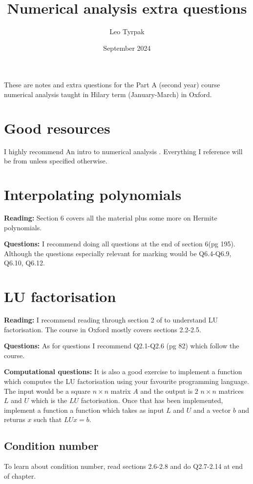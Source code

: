\documentclass{article}
\title{Numerical analysis extra questions}
\author{Leo Tyrpak}
\date{September 2024}
\begin{document}
\maketitle
These are notes and extra questions for the Part A (second year) course numerical analysis taught in Hilary term (January-March) in Oxford.
\section{Good resources}
I highly recommend An intro to numerical analysis \cite{NAbook}.
Everything I reference will be from \cite{NAbook} unless specified otherwise.
\section{Interpolating polynomials}
\textbf{Reading: }Section 6 covers all the material plus some more on Hermite polynomials.

\textbf{Questions: }I recommend doing all questions at the end of section 6(pg 195).
Although the questions especially relevant for marking would be Q6.4-Q6.9, Q6.10, Q6.12.

\section{LU factorisation}
\textbf{Reading: }I recommend reading through section 2 of \cite{NAbook} to understand LU factorisation.
The course in Oxford mostly covers sections 2.2-2.5.

\textbf{Questions: }As for questions I recommend Q2.1-Q2.6 (pg 82) which follow the course.

\textbf{Computational questions: }It is also a good exercise to implement a function which computes the LU factorisation using your favourite programming language. 
The input would be a square $n\times n$ matrix $A$ and the output is $2$ $n\times n$ matrices $L$ and $U$ which is the $LU$ factorisation.
Once that has been implemented, implement a function a function which takes as input $L$ and $U$ and a vector $b$ and returns $x$ such that $LUx=b$.
\subsection{Condition number}
To learn about condition number, read sections 2.6-2.8 and do Q2.7-2.14 at end of chapter.



\end{document}
